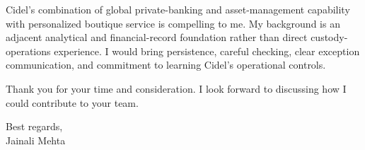 \documentclass[letterpaper,10pt]{article}
\begin{document}
Cidel's combination of global private-banking and asset-management capability with personalized boutique service is compelling to me. My background is an adjacent analytical and financial-record foundation rather than direct custody-operations experience. I would bring persistence, careful checking, clear exception communication, and commitment to learning Cidel's operational controls.

Thank you for your time and consideration. I look forward to discussing how I could contribute to your team.

Best regards,\\[8pt]
Jainali Mehta
\end{document}

